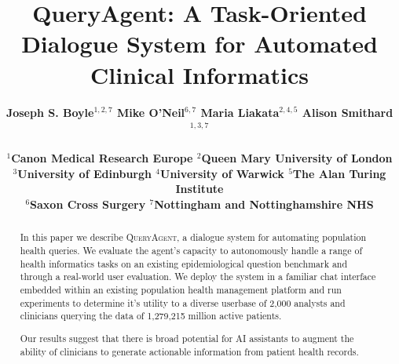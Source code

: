 \documentclass[11pt]{article}
\title{QueryAgent: A Task-Oriented Dialogue System for Automated Clinical Informatics}
\author{ \bf
Joseph S. Boyle$^{1,2,7}$ 
Mike O'Neil$^{6,7}$
Maria Liakata$^{2,4,5}$
Alison Smithard$^{1,3,7}$
\\ \\

$^1$Canon Medical Research Europe $^2$Queen Mary University of London \\ $^3$University of Edinburgh $^4$University of Warwick $^5$The Alan Turing Institute \\ 
$^6$Saxon Cross Surgery $^7$Nottingham and Nottinghamshire NHS
}
\begin{document}



\maketitle
\begin{abstract}
In this paper we describe \textsc{QueryAgent,} a dialogue system for automating population health queries.
We evaluate the agent's capacity to autonomously handle a range of health informatics tasks on an existing epidemiological question benchmark and through a real-world user evaluation.
We deploy the system in a familiar chat interface embedded within an existing population health management platform and run experiments to determine it's utility to a diverse userbase of 2,000 analysts and clinicians querying the data of 1,279,215 million active patients.

Our results suggest that there is broad potential for AI assistants to augment the ability of clinicians to generate actionable information
from patient health records.




\end{abstract}
\end{document}
